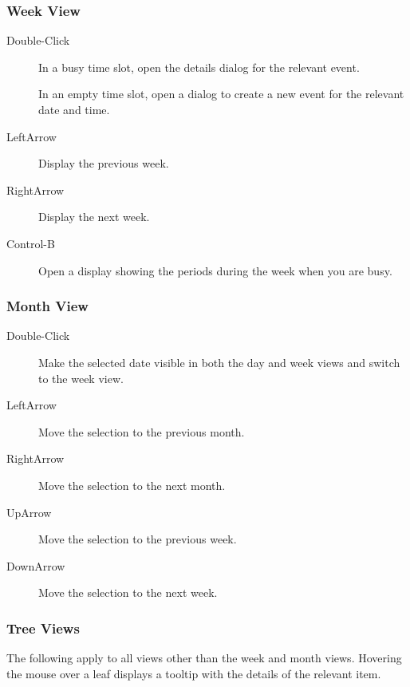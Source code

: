 \documentclass[]{article}
\begin{document}
\subsubsection{Week View}

\begin{description}
\item[Double-Click]
In a busy time slot, open the details dialog for the relevant event.

In an empty time slot, open a dialog to create a new event for the
relevant date and time.
\item[LeftArrow]
Display the previous week.
\item[RightArrow]
Display the next week.
\item[Control-B]
Open a display showing the periods during the week when you are busy.
\end{description}

\subsubsection{Month View}

\begin{description}
\item[Double-Click]
Make the selected date visible in both the day and week views and switch
to the week view.
\item[LeftArrow]
Move the selection to the previous month.
\item[RightArrow]
Move the selection to the next month.
\item[UpArrow]
Move the selection to the previous week.
\item[DownArrow]
Move the selection to the next week.
\end{description}

\subsubsection{Tree Views}

The following apply to all views other than the week and month views.
Hovering the mouse over a leaf displays a tooltip with the details of
the relevant item.
\end{document}
